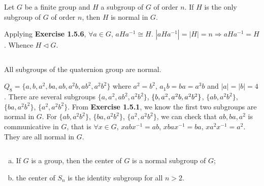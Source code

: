 $$ $$

\begin{ex}
    Let $G$ be a finite group and $H$ a subgroup of $G$ of order $n$. If $H$ is the only subgroup of $G$ of order $n$, then $H$ is normal in $G$.
\end{ex}

\begin{answer}
    Applying \textbf{Exercise 1.5.6}, $\forall a\in G$, $aHa^{-1}\cong H$. $\left| aHa^{-1} \right| =\left| H \right| =n\Rightarrow aHa^{-1}=H$. Whence $H\lhd G$.
\end{answer}

$$ $$

\begin{ex}
    All subgroups of the quaternion group are normal.
\end{ex}

\begin{answer}
    $Q_{8}=\{a,b,a^{2},ba,ab,a^{2}b,ab^{2},a^{2}b^{2}\}$ where $a^{2}=b^{2}$, $a_{1}b=ba=a^{3}b$ and $\left| a \right| =\left| b \right| =4$. There are several subgroups $\{a,a^{2},ab^{2},a^{2}b^{2}\}$, $\{b, a^{2}, a^{2}b,\\ a^{2}b^{2}\}$, $\{ab,a^{2}b^{2}\}$, $\{ba,a^{2}b^{2}\}$, $\{a^{2},a^{2}b^{2}\}$. From \textbf{Exercise 1.5.1}, we know the first two subgroups are normal in $G$. For $\{ab,a^{2}b^{2}\}$, $\{ba,a^{2}b^{2}\}$, $\{a^{2},a^{2}b^{2}\}$, we can check that $ab, ba, a^{2}$ is communicative in $G$, that is $\forall x\in G$, $xabx^{-1}=ab$, $xbax^{-1}=ba$, $xa^{2}x^{-1}=a^{2}$. They are all normal in $G$.
\end{answer}

$$ $$

\begin{ex}
    \begin{enumerate}[(a)]
        \item If $G$ is a group, then the center of $G$ is a normal subgroup of $G$;
        \item the center of $S_{n}$ is the identity subgroup for all $n>2$.
    \end{enumerate}
\end{ex}

